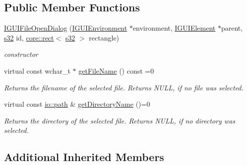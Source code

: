\subsection*{Public Member Functions}
\begin{DoxyCompactItemize}
\item 
\mbox{\label{classirr_1_1gui_1_1IGUIFileOpenDialog_a81f9db27e22941dc8370b7b7630501db}} 
\hyperlink{classirr_1_1gui_1_1IGUIFileOpenDialog_a81f9db27e22941dc8370b7b7630501db}{I\+G\+U\+I\+File\+Open\+Dialog} (\hyperlink{classirr_1_1gui_1_1IGUIEnvironment}{I\+G\+U\+I\+Environment} $\ast$environment, \hyperlink{classirr_1_1gui_1_1IGUIElement}{I\+G\+U\+I\+Element} $\ast$parent, \hyperlink{namespaceirr_ac66849b7a6ed16e30ebede579f9b47c6}{s32} id, \hyperlink{classirr_1_1core_1_1rect}{core\+::rect}$<$ \hyperlink{namespaceirr_ac66849b7a6ed16e30ebede579f9b47c6}{s32} $>$ rectangle)
\begin{DoxyCompactList}\small\item\em constructor \end{DoxyCompactList}\item 
\mbox{\label{classirr_1_1gui_1_1IGUIFileOpenDialog_aa51c982b5e8264588473c147cd9a5b7b}} 
virtual const wchar\+\_\+t $\ast$ \hyperlink{classirr_1_1gui_1_1IGUIFileOpenDialog_aa51c982b5e8264588473c147cd9a5b7b}{get\+File\+Name} () const =0
\begin{DoxyCompactList}\small\item\em Returns the filename of the selected file. Returns N\+U\+LL, if no file was selected. \end{DoxyCompactList}\item 
\mbox{\label{classirr_1_1gui_1_1IGUIFileOpenDialog_a2bc36296e0efe14992e88c9a1f4f5c61}} 
virtual const \hyperlink{namespaceirr_1_1io_ab1bdc45edb3f94d8319c02bc0f840ee1}{io\+::path} \& \hyperlink{classirr_1_1gui_1_1IGUIFileOpenDialog_a2bc36296e0efe14992e88c9a1f4f5c61}{get\+Directory\+Name} ()=0
\begin{DoxyCompactList}\small\item\em Returns the directory of the selected file. Returns N\+U\+LL, if no directory was selected. \end{DoxyCompactList}\end{DoxyCompactItemize}
\subsection*{Additional Inherited Members}


